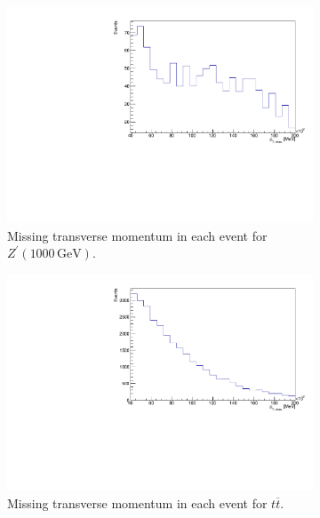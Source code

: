 \begin{figure}[H]%
  \begin{subfigure}{0.49\textwidth}%
    \centering%
    \includegraphics[width=\textwidth]{plots/discriminant/zprime1000.el_met_et.pdf}%
    \caption{Missing transverse momentum in each event for $Z^\prime(1000 \, \si{\giga\eV})$.}%
    \label{fig:5a}%
  \end{subfigure}%
  \hfill
  \begin{subfigure}{0.49\textwidth}%
    \centering%
    \includegraphics[width=\textwidth]{plots/discriminant/ttbar.el_met_et.pdf}%
    \caption{Missing transverse momentum in each event for $t \overline{t}$.}%
    \label{fig:5b}%
  \end{subfigure}\\
  \begin{subfigure}{0.49\textwidth}%

\end{subfigure}
\end{figure}
